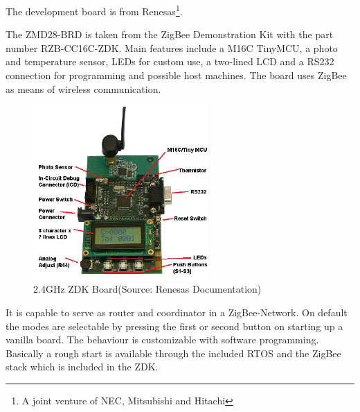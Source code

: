The development board is from Renesas\footnote{A joint venture of NEC, Mitsubishi and Hitachi}. 

The ZMD28-BRD is taken from the ZigBee Demonstration Kit with the part number RZB-CC16C-ZDK.
Main features include a M16C TinyMCU, a photo and temperature sensor, LEDs for custom use, a two-lined LCD and a RS232
connection for programming and possible host machines. The board uses ZigBee as means of wireless communication.
\cite{RenesasZDK}

\begin{figure}[H]
   \centering
   \includegraphics[width=0.6\textwidth]{pic/wsn.png}%
   \caption{2.4GHz ZDK Board(Source: Renesas Documentation)}
   \label{wsnpic}%
\end{figure}

It is capable to serve as router and coordinator in a ZigBee-Network. On default the modes are selectable by
pressing the first or second button on starting up a vanilla board. The behaviour is customizable with 
software programming. Basically a rough start is available through the included RTOS and the ZigBee stack which
is included in the ZDK.
